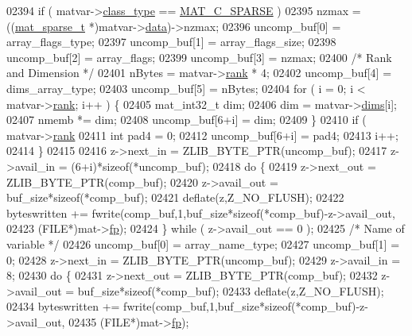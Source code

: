 \begin{DoxyCode}
{{{{{{{{{{{{{{{{02394     \textcolor{keywordflow}{if} ( matvar->\hyperlink{group___m_a_t_aff13035bf3265dd7d9425e5d40c839d4}{class\_type} == \hyperlink{group___m_a_t_ggad4d60ae7b709fc81bfd744fb4c857c40a0d5655b7e6178a2242cb3bb56ff4c8d2}{MAT\_C\_SPARSE} )
02395         nzmax = ((\hyperlink{group___m_a_t_structmat__sparse__t}{mat\_sparse\_t} *)matvar->\hyperlink{group___m_a_t_a5672978efa230bbdecdf38ede781f7fa}{data})->nzmax;
02396     uncomp\_buf[0] = array\_flags\_type;
02397     uncomp\_buf[1] = array\_flags\_size;
02398     uncomp\_buf[2] = array\_flags;
02399     uncomp\_buf[3] = nzmax;
02400     \textcolor{comment}{/* Rank and Dimension */}
02401     nBytes = matvar->\hyperlink{group___m_a_t_a84ba70c96ded13cc555fa75b768d9921}{rank} * 4;
02402     uncomp\_buf[4] = dims\_array\_type;
02403     uncomp\_buf[5] = nBytes;
02404     \textcolor{keywordflow}{for} ( i = 0; i < matvar->\hyperlink{group___m_a_t_a84ba70c96ded13cc555fa75b768d9921}{rank}; i++ ) \{
02405         mat\_int32\_t dim;
02406         dim = matvar->\hyperlink{group___m_a_t_a8e01234e1c862ce3472bb37f5a09b92c}{dims}[i];
02407         nmemb *= dim;
02408         uncomp\_buf[6+i] = dim;
02409     \}
02410     \textcolor{keywordflow}{if} ( matvar->\hyperlink{group___m_a_t_a84ba70c96ded13cc555fa75b768d9921}{rank} %
02411         \textcolor{keywordtype}{int} pad4 = 0;
02412         uncomp\_buf[6+i] = pad4;
02413         i++;
02414     \}
02415 
02416     z->next\_in  = ZLIB\_BYTE\_PTR(uncomp\_buf);
02417     z->avail\_in = (6+i)*\textcolor{keyword}{sizeof}(*uncomp\_buf);
02418     \textcolor{keywordflow}{do} \{
02419         z->next\_out  = ZLIB\_BYTE\_PTR(comp\_buf);
02420         z->avail\_out = buf\_size*\textcolor{keyword}{sizeof}(*comp\_buf);
02421         deflate(z,Z\_NO\_FLUSH);
02422         byteswritten += fwrite(comp\_buf,1,buf\_size*\textcolor{keyword}{sizeof}(*comp\_buf)-z->avail\_out,
02423             (FILE*)mat->\hyperlink{struct__mat__t_a85f562e407ca9ad4d2a6e14f839432b7}{fp});
02424     \} \textcolor{keywordflow}{while} ( z->avail\_out == 0 );
02425     \textcolor{comment}{/* Name of variable */}
02426     uncomp\_buf[0] = array\_name\_type;
02427     uncomp\_buf[1] = 0;
02428     z->next\_in  = ZLIB\_BYTE\_PTR(uncomp\_buf);
02429     z->avail\_in = 8;
02430     \textcolor{keywordflow}{do} \{
02431         z->next\_out  = ZLIB\_BYTE\_PTR(comp\_buf);
02432         z->avail\_out = buf\_size*\textcolor{keyword}{sizeof}(*comp\_buf);
02433         deflate(z,Z\_NO\_FLUSH);
02434         byteswritten += fwrite(comp\_buf,1,buf\_size*\textcolor{keyword}{sizeof}(*comp\_buf)-z->avail\_out,
02435             (FILE*)mat->\hyperlink{struct__mat__t_a85f562e407ca9ad4d2a6e14f839432b7}{fp});
}}}}}}}}}}}}}}}}
\end{DoxyCode}
